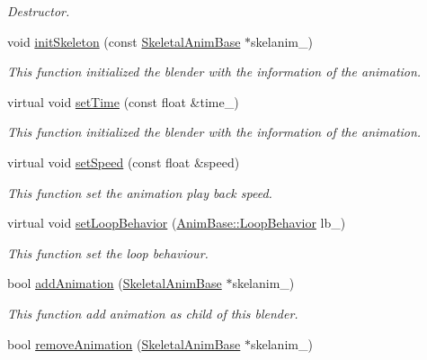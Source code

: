 \begin{DoxyCompactItemize}
\begin{DoxyCompactList}\small\item\em Destructor. \end{DoxyCompactList}\item 
void \hyperlink{class_magnum_1_1_skeletal_anim_blender_a3d2e38f445866341384f1b97368152dc}{init\+Skeleton} (const \hyperlink{class_magnum_1_1_skeletal_anim_base}{Skeletal\+Anim\+Base} $\ast$skelanim\+\_\+)
\begin{DoxyCompactList}\small\item\em This function initialized the blender with the information of the animation. \end{DoxyCompactList}\item 
virtual void \hyperlink{class_magnum_1_1_skeletal_anim_blender_ab80c1e90799256b2bef9da9610e79b04}{set\+Time} (const float \&time\+\_\+)
\begin{DoxyCompactList}\small\item\em This function initialized the blender with the information of the animation. \end{DoxyCompactList}\item 
virtual void \hyperlink{class_magnum_1_1_skeletal_anim_blender_afaf5a75b6f24eb070c692075207564d4}{set\+Speed} (const float \&speed)
\begin{DoxyCompactList}\small\item\em This function set the animation play back speed. \end{DoxyCompactList}\item 
virtual void \hyperlink{class_magnum_1_1_skeletal_anim_blender_a8535d7b72b50b66dbdf9178adb6d84bc}{set\+Loop\+Behavior} (\hyperlink{class_magnum_1_1_anim_base_ad6b3de9518d395df5ca9865f268ec581}{Anim\+Base\+::\+Loop\+Behavior} lb\+\_\+)
\begin{DoxyCompactList}\small\item\em This function set the loop behaviour. \end{DoxyCompactList}\item 
bool \hyperlink{class_magnum_1_1_skeletal_anim_blender_ab63b9cb4b608b6fdb46b288aea6b8d3a}{add\+Animation} (\hyperlink{class_magnum_1_1_skeletal_anim_base}{Skeletal\+Anim\+Base} $\ast$skelanim\+\_\+)
\begin{DoxyCompactList}\small\item\em This function add animation as child of this blender. \end{DoxyCompactList}\item 
bool \hyperlink{class_magnum_1_1_skeletal_anim_blender_acf0e3d7c7210cc049495cdc1748bcbf0}{remove\+Animation} (\hyperlink{class_magnum_1_1_skeletal_anim_base}{Skeletal\+Anim\+Base} $\ast$skelanim\+\_\+)

\end{DoxyCompactItemize}
